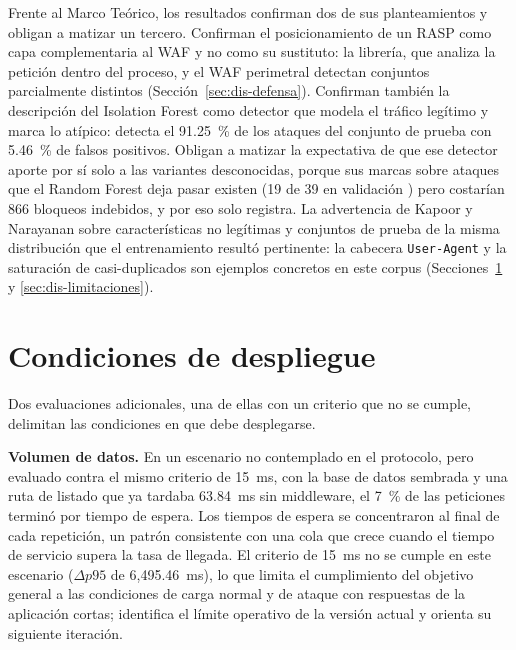 Frente al Marco Teórico, los resultados confirman dos de sus planteamientos y obligan a matizar un
tercero. Confirman el posicionamiento de un RASP como capa complementaria al WAF y no como su
sustituto: la librería, que analiza la petición dentro del proceso, y el WAF perimetral detectan
conjuntos parcialmente distintos (Sección~\ref{sec:dis-defensa}). Confirman también la descripción
del Isolation Forest como detector que modela el tráfico legítimo y marca lo atípico: detecta el
91.25~\% de los ataques del conjunto de prueba con 5.46~\% de falsos positivos. Obligan a matizar
la expectativa de que ese detector aporte por sí solo a las variantes desconocidas, porque sus
marcas sobre ataques que el Random Forest deja pasar existen (19 de 39 en validación \cite{valenzuela2026ia}) pero
costarían 866 bloqueos indebidos, y por eso solo registra. La advertencia de Kapoor y Narayanan
\cite{kapoor2023} sobre características no legítimas y conjuntos de prueba de la misma distribución
que el entrenamiento resultó pertinente: la cabecera \texttt{User-Agent} y la saturación de
casi-duplicados son ejemplos concretos en este corpus (Secciones~\ref{sec:dis-despliegue} y
\ref{sec:dis-limitaciones}).

\section{Condiciones de despliegue}
\label{sec:dis-despliegue}

Dos evaluaciones adicionales, una de ellas con un criterio que no se cumple, delimitan las
condiciones en que debe desplegarse.

\textbf{Volumen de datos.} En un escenario no contemplado en el protocolo, pero evaluado contra el mismo criterio de 15~ms, con la base de datos
sembrada y una ruta de listado que ya tardaba 63.84~ms sin middleware, el 7~\% de las peticiones
terminó por tiempo de espera. Los tiempos de espera se concentraron al final de cada repetición,
un patrón consistente con una cola que crece cuando el tiempo de servicio supera la tasa de
llegada. El criterio de 15~ms no se cumple en este escenario ($\Delta p95$ de 6{,}495.46~ms), lo que
limita el cumplimiento del objetivo general a las condiciones de carga normal y de ataque con
respuestas de la aplicación cortas; identifica el límite operativo de la versión actual y
orienta su siguiente iteración.

